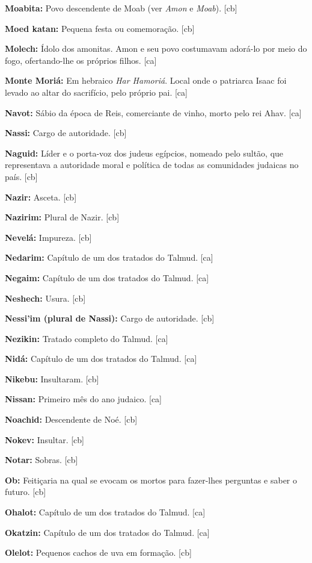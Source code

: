 \textbf{Moabita:} Povo descendente de Moab (ver \emph{Amon} e \emph{Moab}). [cb]

\textbf{Moed katan:} Pequena festa ou comemoração. [cb]

\textbf{Molech:} Ídolo dos amonitas. Amon e seu povo costumavam adorá-lo por
meio do fogo, ofertando-lhe os próprios filhos. [ca]

\textbf{Monte Moriá:} Em hebraico \emph{Har Hamoriá}. Local 
onde o patriarca Isaac foi
levado ao altar do sacrifício, pelo próprio pai. [ca]

\textbf{Navot:} Sábio da época de Reis, comerciante de vinho, morto pelo rei Ahav. [ca]

\textbf{Nassi:} Cargo de autoridade. [cb]

\textbf{Naguid:} Líder e o porta-voz dos judeus egípcios,
nomeado pelo sultão, que representava a autoridade moral e política
de todas as comunidades judaicas no país. [cb]

\textbf{Nazir:} Asceta. [cb]

\textbf{Nazirim:} Plural de Nazir. [cb]

\textbf{Nevelá:} Impureza. [cb]

\textbf{Nedarim:} Capítulo de um dos tratados do Talmud. [ca]

\textbf{Negaim:} Capítulo de um dos tratados do Talmud. [ca]

\textbf{Neshech:} Usura. [cb]

\textbf{Nessi'im (plural de Nassi):} Cargo de autoridade. [cb]

\textbf{Nezikin:} Tratado completo do Talmud. [ca]

\textbf{Nidá:} Capítulo de um dos tratados do Talmud. [ca]

\textbf{Nikebu:} Insultaram. [cb]

\textbf{Nissan:} Primeiro mês do ano judaico. [ca]

\textbf{Noachid:} Descendente de Noé. [cb]

\textbf{Nokev:} Insultar. [cb]

\textbf{Notar:} Sobras. [cb]

\textbf{Ob:} Feitiçaria na qual se evocam os mortos para fazer-lhes
perguntas e saber o futuro. [cb]

\textbf{Ohalot:} Capítulo de um dos tratados do Talmud. [ca]

\textbf{Okatzin:} Capítulo de um dos tratados do Talmud. [ca]

\textbf{Olelot:} Pequenos cachos de uva em formação. [cb]

